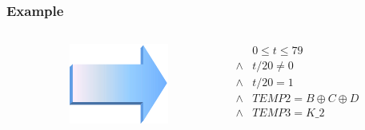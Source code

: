 
\begin{frame}
\frametitle{Example}

\begin{columns}
\begin{column}{.3\textwidth}
%
\end{column}
\begin{column}{.1\textwidth}
\pause\pause
\includegraphics[width=\textwidth]{arrow}
\end{column}
\begin{column}{.6\textwidth}
$\begin{array}{ll}
      & 0 \le t \le 79 \\
\land & t/20\not=0 \\
\land & t/20=1 \\
\land & \mathit{TEMP2}=B \oplus C \oplus D \\
\land & \mathit{TEMP3}=K\_2
\end{array}$
\end{column}
\end{columns}

\end{frame}


